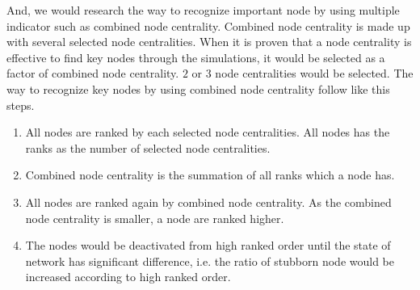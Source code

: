 And, we would research the way to recognize important node by using multiple indicator such as combined node centrality. Combined node centrality is made up with several selected node centralities. When it is proven that a node centrality is effective to find key nodes through the simulations, it would be selected as a factor of combined node centrality. $2$ or $3$ node centralities would be selected. 
The way to recognize key nodes by using combined node centrality follow like this steps. 
\begin{enumerate}
	\item All nodes are ranked by each selected node centralities. All nodes has the ranks as the number of selected node centralities.  
	\item Combined node centrality is the summation of all ranks which a node has. 
	\item All nodes are ranked again by combined node centrality. As the combined node centrality is smaller, a node are ranked higher.        
	\item The nodes would be deactivated from high ranked order until the state of network has significant difference, i.e. the ratio of stubborn node would be increased according to high ranked order. 
\end{enumerate}
 
